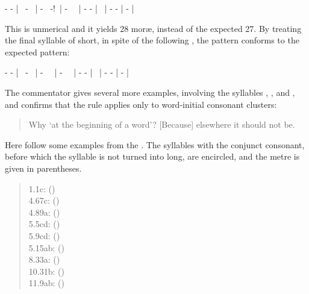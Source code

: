 - - | \shortsyllable\ - \shortsyllable\ | - \shortsyllable\ -!~| 
- \shortsyllable\ \shortsyllable\ | 
- - | \shortsyllable\ | -  - | - |

This is unmerical and it yields 28 mor\ae, instead 
of the expected 27. By treating the final syllable of  short, 
in spite of the following , the pattern conforms 
to the expected pattern: 

- - | \shortsyllable\ - \shortsyllable\ | 
- \shortsyllable\ \shortsyllable\ | - \shortsyllable\ \shortsyllable\ | - - | 
\shortsyllable\ | - - | - |

The commentator gives several more examples, involving the syllables
, , and , and confirms that the rule
applies only to word-initial consonant clusters: 

\begin{quote}
{\footnotesize{}

Why `at the beginning of a word'? [Because] elsewhere it should not be.}
\end{quote}

\noindent
Here follow some examples from the \VSS. The syllables 
with the  conjunct consonant, before which the syllable 
is not turned into long, are encircled, and the metre is given in 
parentheses.

\begin{quote}	
1.1c:  ()\\
4.67c:  ()\\
4.89a:  ()\\
5.5cd:  ()\\
5.9cd:   ()\\
5.15ab:  ()\\
8.33a:  
 ()\\
10.31b:  ()\\
11.9ab:  ()
\end{quote}

